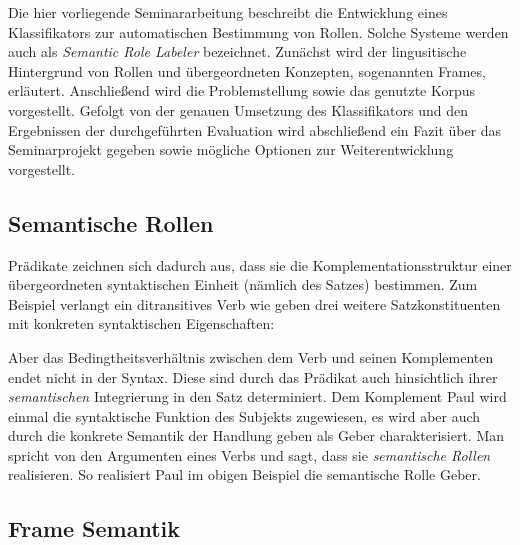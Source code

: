 \documentclass[12pt]{article}
\begin{document}
Die hier vorliegende Seminararbeitung beschreibt die Entwicklung eines Klassifikators zur automatischen Bestimmung von Rollen. Solche Systeme werden auch als \textit{Semantic Role Labeler} bezeichnet. Zunächst wird der lingusitische Hintergrund von Rollen und übergeordneten Konzepten, sogenannten Frames, erläutert. Anschließend wird die Problemstellung sowie das genutzte Korpus vorgestellt. Gefolgt von der genauen Umsetzung des Klassifikators und den Ergebnissen der durchgeführten Evaluation wird abschließend ein Fazit über das Seminarprojekt gegeben sowie mögliche Optionen zur Weiterentwicklung vorgestellt. 

\subsection{Semantische Rollen}

Prädikate zeichnen sich dadurch aus, dass sie die Komplementationsstruktur einer
übergeordneten syntaktischen Einheit (nämlich des Satzes) bestimmen. Zum
Beispiel verlangt ein ditransitives Verb wie \glqq{}geben\grqq{} drei weitere Satzkonstituenten mit konkreten syntaktischen Eigenschaften:

\begin{center}
\end{center}

Aber das Bedingtheitsverhältnis zwischen dem Verb und seinen Komplementen 
endet nicht in der Syntax. Diese sind durch das Prädikat auch hinsichtlich ihrer 
\textit{semantischen} Integrierung in den Satz determiniert. Dem Komplement \glqq{}Paul\grqq{}
wird einmal die syntaktische Funktion des Subjekts zugewiesen, es wird aber auch
durch die konkrete Semantik der Handlung \glqq{}geben\grqq{} als 
\glqq{}Geber\grqq{} charakterisiert. Man spricht von den Argumenten
eines Verbs und sagt, dass sie \textit{semantische Rollen} realisieren. So realisiert \glqq{}Paul\grqq{} im obigen Beispiel die semantische Rolle \glqq{}Geber\grqq{}.

\subsection{Frame Semantik}
\end{document}
